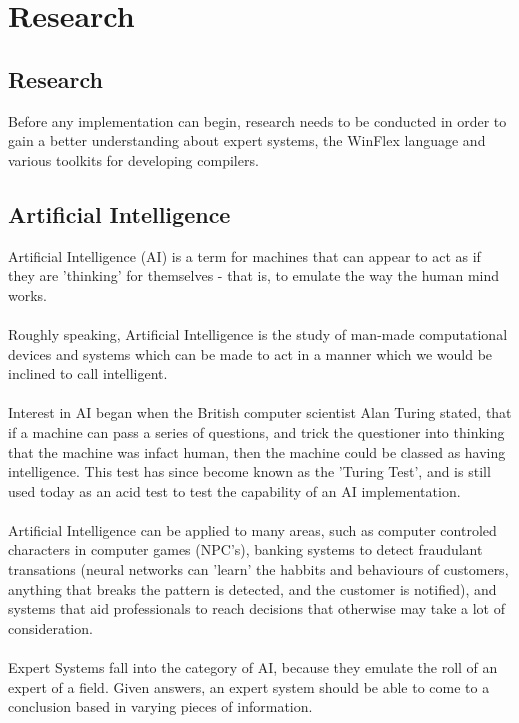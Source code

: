 \documentclass[12pt]{report}
\begin{document}
\chapter{Research}
\section[Research]{Research}\label{sec:intro_to_research}
Before any implementation can begin, research needs to be conducted in order to gain a better understanding about expert systems, the WinFlex language and various toolkits for developing compilers.

\section{Artificial Intelligence}\label{sec:AI}
Artificial Intelligence (AI) is a term for machines that can appear to act as if they are 'thinking' for themselves - that is, to emulate the way the human mind works.\\
\\
Roughly speaking, Artificial Intelligence is the study of man-made computational devices and systems which can be made to act in a manner which we would be inclined to call intelligent. \citep{whatisai}
\\
\\
Interest in AI began when the British computer scientist Alan Turing stated, that if a machine can pass a series of questions, and trick the questioner into thinking that the machine was infact human, then the machine could be classed as having intelligence.  This test has since become known as the 'Turing Test', and is still used today as an acid test to test the capability of an AI implementation.\\
\\
Artificial Intelligence can be applied to many areas, such as computer controled characters in computer games (NPC's), banking systems to detect fraudulant transations (neural networks can 'learn' the habbits and behaviours of customers, anything that breaks the pattern is detected, and the customer is notified), and systems that aid professionals to reach decisions that otherwise may take a lot of consideration.
\\
\\
Expert Systems fall into the category of AI, because they emulate the roll of an expert of a field.  Given answers, an expert system should be able to come to a conclusion based in varying pieces of information.
\end{document}
